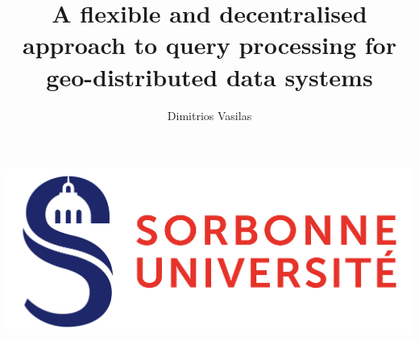 \documentclass[a4paper,usenames,dvipsnames]{report}
\title{A flexible and decentralised approach to query processing for geo-distributed data systems}
\author{Dimitrios Vasilas}
\date{}
\newcommand\blankpage{%
    \null
    \thispagestyle{empty}%
    \addtocounter{page}{-1}%
    \newpage}
\begin{document}

\afterpage{\blankpage}

\thispagestyle{empty}


\includegraphics[scale=.08]{./figures/Logo_Sorbonne_Universite.png}

\vspace*{1.5cm}
\end{document}
